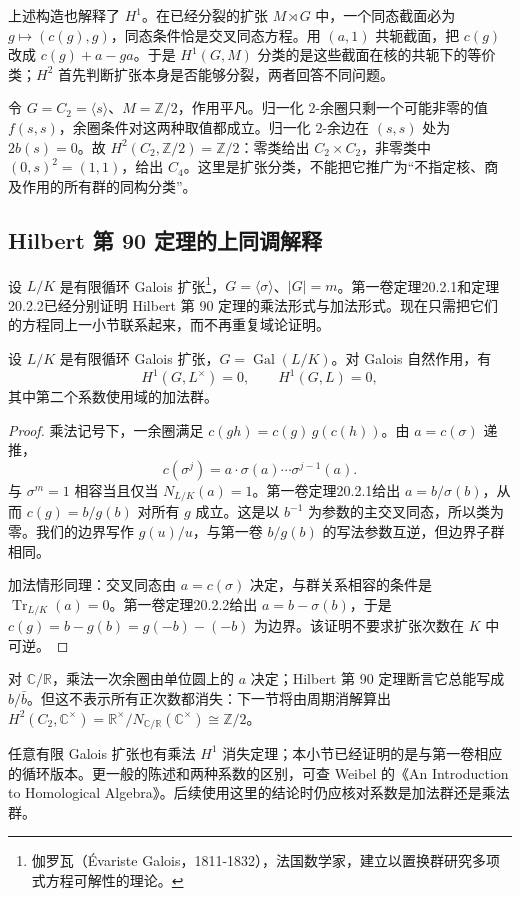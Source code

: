 上述构造也解释了 \(H^1\)。在已经分裂的扩张 \(M\rtimes G\) 中，一个同态截面必为 \(g\mapsto(c(g),g)\)，同态条件恰是交叉同态方程。用 \((a,1)\) 共轭截面，把 \(c(g)\) 改成 \(c(g)+a-ga\)。于是 \(H^1(G,M)\) 分类的是这些截面在核的共轭下的等价类；\(H^2\) 首先判断扩张本身是否能够分裂，两者回答不同问题。

\begin{example}\label{b4:exm:cyclic-two-extension}
令 \(G=C_2=\langle s\rangle\)、\(M=\mathbb Z/2\)，作用平凡。归一化 \(2\)-余圈只剩一个可能非零的值 \(f(s,s)\)，余圈条件对这两种取值都成立。归一化 \(2\)-余边在 \((s,s)\) 处为 \(2b(s)=0\)。故 \(H^2(C_2,\mathbb Z/2)=\mathbb Z/2\)：零类给出 \(C_2\times C_2\)，非零类中 \((0,s)^2=(1,1)\)，给出 \(C_4\)。这里是扩张分类，不能把它推广为“不指定核、商及作用的所有群的同构分类”。
\end{example}

\subsection{Hilbert 第 90 定理的上同调解释}
\label{b4:subsec:1102:03}

设 \(L/K\) 是有限循环 Galois 扩张\footnote{伽罗瓦（Évariste Galois，1811-1832），法国数学家，建立以置换群研究多项式方程可解性的理论。}，\(G=\langle\sigma\rangle\)、\(|G|=m\)。第一卷定理20.2.1和定理20.2.2已经分别证明 Hilbert 第 90 定理的乘法形式与加法形式。现在只需把它们的方程同上一小节联系起来，而不再重复域论证明。

\begin{proposition}\label{b4:prop:hilbert90-cohomology}
设 \(L/K\) 是有限循环 Galois 扩张，\(G=\operatorname{Gal}(L/K)\)。对 Galois 自然作用，有
\[
H^1(G,L^\times)=0,\qquad H^1(G,L)=0,
\]
其中第二个系数使用域的加法群。
\end{proposition}
\begin{proof}
乘法记号下，一余圈满足 \(c(gh)=c(g)\,g(c(h))\)。由 \(a=c(\sigma)\) 递推，
\[
c(\sigma^j)=a\cdot\sigma(a)\cdots\sigma^{j-1}(a).
\]
与 \(\sigma^m=1\) 相容当且仅当 \(N_{L/K}(a)=1\)。第一卷定理20.2.1给出 \(a=b/\sigma(b)\)，从而 \(c(g)=b/g(b)\) 对所有 \(g\) 成立。这是以 \(b^{-1}\) 为参数的主交叉同态，所以类为零。我们的边界写作 \(g(u)/u\)，与第一卷 \(b/g(b)\) 的写法参数互逆，但边界子群相同。

加法情形同理：交叉同态由 \(a=c(\sigma)\) 决定，与群关系相容的条件是 \(\operatorname{Tr}_{L/K}(a)=0\)。第一卷定理20.2.2给出 \(a=b-\sigma(b)\)，于是 \(c(g)=b-g(b)=g(-b)-(-b)\) 为边界。该证明不要求扩张次数在 \(K\) 中可逆。
\end{proof}

对 \(\mathbb C/\mathbb R\)，乘法一次余圈由单位圆上的 \(a\) 决定；Hilbert 第 90 定理断言它总能写成 \(b/\bar b\)。但这不表示所有正次数都消失：下一节将由周期消解算出
\(H^2(C_2,\mathbb C^\times)=\mathbb R^\times/N_{\mathbb C/\mathbb R}(\mathbb C^\times)\cong\mathbb Z/2\)。

\ProseParagraphBreak
任意有限 Galois 扩张也有乘法 \(H^1\) 消失定理；本小节已经证明的是与第一卷相应的循环版本。更一般的陈述和两种系数的区别，可查 Weibel 的《An Introduction to Homological Algebra》\cite[Hilbert's Theorem 90 6.3.7, Hilbert's Theorem 90 6.4.7, Example 6.4.8]{Weibel1994HomologicalAlgebra}。后续使用这里的结论时仍应核对系数是加法群还是乘法群。
